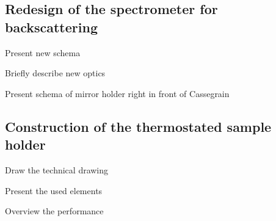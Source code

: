 \subsection{Redesign of the spectrometer for backscattering}
\begin{docitemize}
	\item Present new schema
	\item Briefly describe new optics
	\item Present schema of mirror holder right in front of Cassegrain
\end{docitemize}


\subsection{Construction of the thermostated sample holder}
\begin{docitemize}
	\item Draw the technical drawing
	\item Present the used elements
	\item Overview the performance
\end{docitemize}

